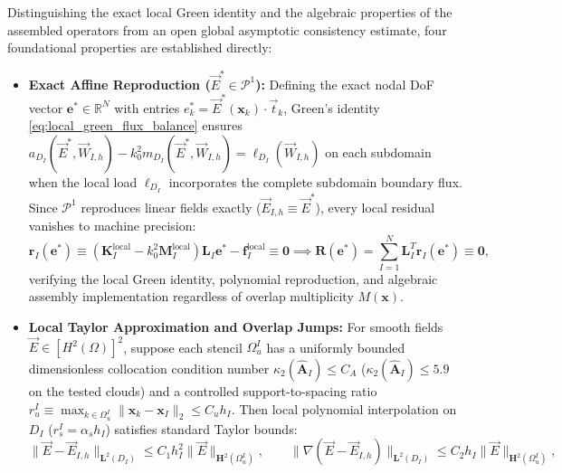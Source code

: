 \documentclass[VANCOUVER,Times1COL]{WileyNJD-v5}
\begin{document}
Distinguishing the exact local Green identity and the algebraic properties of the assembled operators from an open global asymptotic consistency estimate, four foundational properties are established directly:
\begin{itemize}
    \item \textbf{Exact Affine Reproduction ($\vec{E}^* \in \mathcal{P}^1$):} Defining the exact nodal DoF vector $\mathbf{e}^* \in \mathbb{R}^N$ with entries $e_k^* = \vec{E}^*(\mathbf{x}_k) \cdot \vec{t}_k$, Green's identity \eqref{eq:local_green_flux_balance} ensures $a_{D_I}(\vec{E}^*, \vec{W}_{I,h}) - k_0^2 m_{D_I}(\vec{E}^*, \vec{W}_{I,h}) = \ell_{D_I}(\vec{W}_{I,h})$ on each subdomain when the local load $\ell_{D_I}$ incorporates the complete subdomain boundary flux. Since $\mathcal{P}^1$ reproduces linear fields exactly ($\vec{E}_{I,h} \equiv \vec{E}^*$), every local residual vanishes to machine precision:
          \begin{equation}
              \mathbf{r}_I(\mathbf{e}^*) \equiv (\mathbf{K}_I^{\mathrm{local}} - k_0^2 \mathbf{M}_I^{\mathrm{local}}) \mathbf{L}_I \mathbf{e}^* - \mathbf{f}_I^{\mathrm{local}} \equiv \mathbf{0} \implies \mathbf{R}(\mathbf{e}^*) = \sum_{I=1}^N \mathbf{L}_I^T \mathbf{r}_I(\mathbf{e}^*) \equiv \mathbf{0},
              \label{eq:subdomain_residual_zero}
          \end{equation}
          verifying the local Green identity, polynomial reproduction, and algebraic assembly implementation regardless of overlap multiplicity $M(\mathbf{x})$.
    \item \textbf{Local Taylor Approximation and Overlap Jumps:} For smooth fields $\vec{E} \in [H^2(\Omega)]^2$, suppose each stencil $\Omega_u^I$ has a uniformly bounded dimensionless collocation condition number $\kappa_2(\widehat{\mathbf{A}}_I) \le C_A$ ($\kappa_2(\widehat{\mathbf{A}}_I) \le 5.9$ on the tested clouds) and a controlled support-to-spacing ratio $r_u^I \equiv \max_{k \in \Omega_u^I} \|\mathbf{x}_k - \mathbf{x}_I\|_2 \le C_u h_I$. Then local polynomial interpolation on $D_I$ ($r_s^I = \alpha_s h_I$) satisfies standard Taylor bounds:
          \begin{equation}
              \|\vec{E} - \vec{E}_{I,h}\|_{\boldsymbol{L}^2(D_I)} \le C_1 h_I^2 \|\vec{E}\|_{\boldsymbol{H}^2(\Omega_u^I)}, \qquad
              \|\nabla(\vec{E} - \vec{E}_{I,h})\|_{\boldsymbol{L}^2(D_I)} \le C_2 h_I \|\vec{E}\|_{\boldsymbol{H}^2(\Omega_u^I)},
              \label{eq:local_taylor_bounds}
          \end{equation}

\end{itemize}
\end{document}
